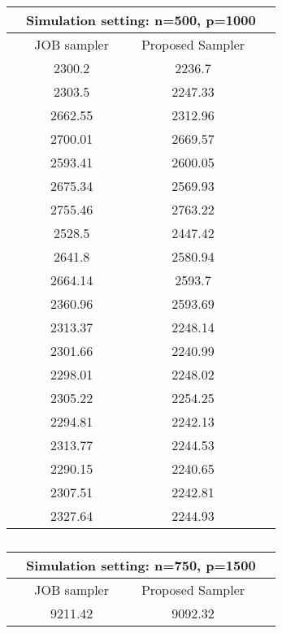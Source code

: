 \documentclass[noinfoline,11pt]{imsart}
\numberwithin{equation}{section}
\theoremstyle{plain}
\begin{document}
\begin{table}[hbt!]
\begin{subtable}{0.45\textwidth}
\centering
\begin{tabular}{|@{}cccc@{}|}
\toprule
 & \multicolumn{2}{l}{Simulation setting: n=500, p=1000} &  \\
 \midrule
 & JOB sampler   & Proposed Sampler  &  \\
 & 2300.2        & 2236.7            &  \\
 & 2303.5        & 2247.33           &  \\
 & 2662.55       & 2312.96           &  \\
 & 2700.01       & 2669.57           &  \\
 & 2593.41       & 2600.05           &  \\
 & 2675.34       & 2569.93           &  \\
 & 2755.46       & 2763.22           &  \\
 & 2528.5        & 2447.42           &  \\
 & 2641.8        & 2580.94           &  \\
 & 2664.14       & 2593.7            &  \\
 & 2360.96       & 2593.69           &  \\
 & 2313.37       & 2248.14           &  \\
 & 2301.66       & 2240.99           &  \\
 & 2298.01       & 2248.02           &  \\
 & 2305.22       & 2254.25           &  \\
 & 2294.81       & 2242.13           &  \\
 & 2313.77       & 2244.53           &  \\
 & 2290.15       & 2240.65           &  \\
 & 2307.51       & 2242.81           &  \\
 & 2327.64       & 2244.93           & \\
 \bottomrule
\end{tabular}
\caption{}
\label{tab:table1_a}
\end{subtable}%
\hfill
\begin{subtable}{0.45\textwidth}
\centering 
\begin{tabular}{|@{}cccc@{}|}
\toprule
 & \multicolumn{2}{l}{Simulation setting: n=750, p=1500} &  \\ \midrule
 & JOB sampler   & Proposed Sampler  &  \\
 & 9211.42       & 9092.32           &  \\

\end{tabular}
\end{subtable}
\end{table}
\end{document}

